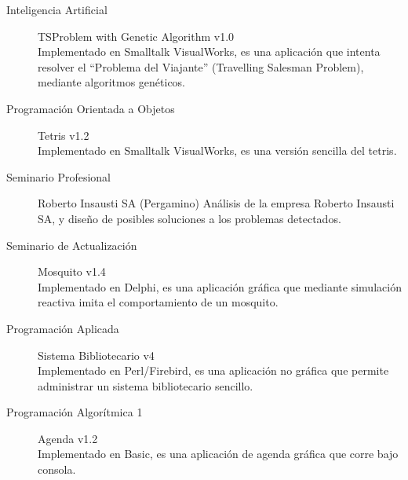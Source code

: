 \documentclass[a4paper]{article}
\begin{document}
\begin{description}
\item [ Inteligencia Artificial ] TSProblem with Genetic Algorithm v1.0\\
Implementado en Smalltalk VisualWorks, es una aplicación que intenta resolver el ``Problema del Viajante'' (Travelling Salesman Problem), mediante algoritmos genéticos.
\item [ Programación Orientada a Objetos ] Tetris v1.2\\
Implementado en Smalltalk VisualWorks, es una versión sencilla del tetris.
\item [ Seminario Profesional ] Roberto Insausti SA (Pergamino)
Análisis de la empresa Roberto Insausti SA, y diseño de posibles soluciones a los problemas detectados.
\item [ Seminario de Actualización ] Mosquito v1.4\\
Implementado en Delphi, es una aplicación gráfica que mediante simulación reactiva imita el comportamiento de un mosquito.
\item [ Programación Aplicada ] Sistema Bibliotecario v4\\
Implementado en Perl/Firebird, es una aplicación no gráfica que permite administrar un sistema bibliotecario sencillo.
\item [ Programación Algorítmica 1 ] Agenda v1.2\\
Implementado en Basic, es una aplicación de agenda gráfica que corre bajo consola.
\end{description}
\end{document}
